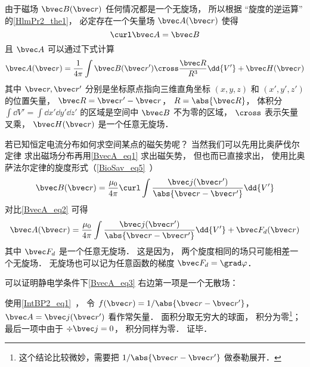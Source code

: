 
\begin{issues}
\issueDraft
{}
\end{issues}


由于磁场 $\bvec B(\bvec r)$ 任何情况都是一个无旋场， 所以根据 “旋度的逆运算” 的\autoref{HlmPr2_the1}， 必定存在一个矢量场 $\bvec A(\bvec r)$ 使得
\begin{equation}\label{BvecA_eq2}
\curl \bvec A = \bvec B
\end{equation}
且 $\bvec A$ 可以通过下式计算
\begin{equation}\label{BvecA_eq1}
\bvec A(\bvec r) = \frac{1}{4\pi} \int \bvec B(\bvec r') \cross \frac{\bvec R}{R^3} \dd{V'} + \bvec H(\bvec r)
\end{equation}
其中 $\bvec r, \bvec r'$ 分别是坐标原点指向三维直角坐标 $(x, y, z)$ 和 $(x', y', z')$ 的位置矢量， $\bvec R = \bvec r' - \bvec r$， $R = \abs{\bvec R}$， 体积分 $\int\dd{V'} = \int\dd{x'}\dd{y'}\dd{z'}$ 的区域是空间中 $\bvec B$ 不为零的区域， $\cross$ 表示矢量叉乘， $\bvec H(\bvec r)$ 是一个任意无旋场．

若已知恒定电流分布如何求空间某点的磁矢势呢？ 当然我们可以先用比奥萨伐尔定律 求出磁场分布再用\autoref{BvecA_eq1} 求出磁矢势， 但也而已直接求出， 使用比奥萨法尔定律的旋度形式（\autoref{BioSav_eq5}~）
\begin{equation}
\bvec B(\bvec r) = \frac{\mu_0}{4\pi} \curl \int \frac{\bvec j(\bvec r')}{\abs{\bvec r - \bvec r'}}\dd{V'}
\end{equation}
对比\autoref{BvecA_eq2} 可得
\begin{equation}\label{BvecA_eq3}
\bvec A(\bvec r) = \frac{\mu_0}{4\pi} \int \frac{\bvec j(\bvec r')}{\abs{\bvec r - \bvec r'}}\dd{V'} + \bvec F_{d}(\bvec r)
\end{equation}
其中 $\bvec F_d$ 是一个任意无旋场． 这是因为， 两个旋度相同的场只可能相差一个无旋场． 无旋场也可以记为任意函数的梯度 $\bvec F_d = \grad \varphi$．

可以证明静电学条件下\autoref{BvecA_eq3} 右边第一项是一个无散场：
\begin{equation}

\end{equation}

使用\autoref{IntBP2_eq1}~， 令 $f(\bvec r) = 1/\abs{\bvec r - \bvec r'}$， $\bvec A = \bvec j(\bvec r')$ 看作常矢量． 面积分取无穷大的球面， 积分为零\footnote{这个结论比较微妙，需要把 $1/\abs{\bvec r - \bvec r'}$ 做泰勒展开．}； 最后一项中由于 $\div \bvec j = 0$， 积分同样为零． 证毕．


